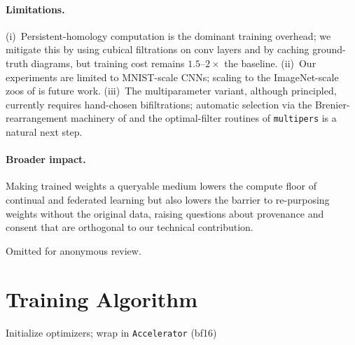 \documentclass{article}
\begin{document}
\paragraph{Limitations.}
(i)~Persistent-homology computation is the dominant training overhead; we
mitigate this by using cubical filtrations on conv layers and by caching
ground-truth diagrams, but training cost remains $1.5$--$2\times$ the
baseline.  (ii)~Our experiments are limited to MNIST-scale CNNs; scaling
to the ImageNet-scale zoos of \citet{soroDiffusionBasedNeuralNetwork2024}
is future work.  (iii)~The multiparameter variant, although principled,
currently requires hand-chosen bifiltrations; automatic selection via
the Brenier-rearrangement machinery of \citet{brenierPolarFactorizationMonotone1991}
and the optimal-filter routines of \texttt{multipers} is a natural next
step.

\paragraph{Broader impact.}
Making trained weights a queryable medium lowers the compute floor of
continual and federated learning but also lowers the barrier to
re-purposing weights without the original data, raising questions about
provenance and consent that are orthogonal to our technical contribution.


\begin{ack}
Omitted for anonymous review.
\end{ack}






\appendix

\section{Training Algorithm}
\label{app:algo}

\begin{algorithm}[H]
\caption{Training procedure for the double-encoder Transformer with
topological--spectral regularization.}
\label{alg:training}
\SetAlgoLined
{}
Initialize optimizers; wrap in \texttt{Accelerator} (bf16)\;
\end{algorithm}
\end{document}
